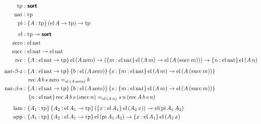 \documentclass[11pt,twoside]{article}
\newcommand{\braces}[1]{\{#1\}}
\newcommand{\parens}[1]{(#1)}
\newcommand{\sortclass}{\ensuremath{\textbf{\textsf{sort}}}}
\newcommand{\eqclass}[3]{{#2}=_{#1}{#3}}
\newcommand{\piclass}[3]{\braces{{#2}\mathbin{:}{#1}}\,{#3}}
\newcommand{\arrclass}[2]{{#1}\to{#2}}
\newcommand{\appobj}[2]{{#1}\,{#2}}
\begin{document}
\begin{figure}
  
  \begin{align*}
    \tpsort
    & : \sortclass \\
    \nattp
    & : \tpsort \\
    \pitp
    & : \piclass{\tpsort}{A}{\arrclass{\parens{\arrclass{\elof{A}}{\tpsort}}}{\tpsort}} \\[1ex]
%
    \elfam 
    & : \arrclass{\tpsort}{\sortclass} \\
    \zerocon
    & : \elof{\nattp} \\
    \succcon
    & : \arrclass {\elof{\nattp}}{\elof{\nattp}} \\
    \reccon
    &  :
      \piclass{\arrclass{\elof{\nattp}}{\tpsort}}{A}{
      \arrclass{\elofp{\appobj{A}{\zerocon}}}{
      \arrclass{\parens{
      \piclass{\elof{\nattp}}{m}{
        \arrclass{\elofp{\appobj{A}{m}}}{\elofp{\appobj{A}{\parens{\succof{m}}}}}}}}
      {\piclass{\elof{\nattp}}{n}{\elofp{\appobj{A}{n}}}}}} \\[1ex] 
%
    \reczcon
    & :
      \piclass{\arrclass{\elof{\nattp}}{\tpsort}}{A}{
      \piclass{\elofp{\appobj{A}{\zerocon}}}{b}{
      \piclass{\piclass{\elof{\nattp}}{m}{\arrclass{\elofp{\appobj{A}{m}}}{\elofp{\appobj{A}{\parens{\succof{m}}}}}}}{s}{
      }}} \\
    & \quad
      \eqclass{\elofp{\appobj{A}{\zerocon}}}{\recof{A}{b}{s}{\zerocon}}{b} \\
%
    \recscon
    & :
      \piclass{\arrclass{\elof{\nattp}}{\tpsort}}{A}{
      \piclass{\elofp{\appobj{A}{\zerocon}}}{b}{
      \piclass{\piclass{\elof{\nattp}}{m}{\arrclass{\elofp{\appobj{A}{m}}}{\elofp{\appobj{A}{\parens{\succof{m}}}}}}}{s}{
      }}} \\
    & \quad
      \piclass{\elof{\nattp}}{n}{
      \eqclass{\elofp{\appobj{A}{n}}}
      {\recof{A}{b}{s}{\parens{\succof{n}}}}
      {\appobj{\appobj{s}{n}}{\parens{\recof{A}{b}{s}{n}}}}} \\[1ex]
%
    \lamcon
    & :
      \piclass{\tpsort}{A_{1}}{
      \piclass{\arrclass{\elof{A_{1}}}{\tpsort}}{A_{2}}{
      \arrclass{\parens{\piclass{\elof{A_{1}}}{x}{\elofp{\appobj{A_{2}}{x}}}}}{
      \elfam{\parens{\piof{A_{1}}{A_{2}}}}}}} \\
    \appcon
    & :
      \piclass{\tpsort}{A_{1}}{
      \piclass{\arrclass{\elof{A_{1}}}{\tpsort}}{A_{2}}{
      \arrclass{\elofp{\piof{A_{1}}{A_{2}}}}{
      \piclass{\elof{A_{1}}}{x}{\elofp{\appobj{A_{2}}{x}}}}}} \\[1ex]

\end{align*}
\end{figure}
\end{document}
